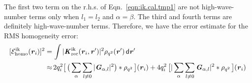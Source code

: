 \documentclass[aps,pre,preprint,unsortedaddress]{revtex4}
\renewcommand{\v}[1]{\textbf{\textit{#1}}}
\renewcommand{\d}[1]{\textsf{#1}}
\begin{document}
The first two term on the r.h.s. of Eqn.~\eqref{eqn:ik.cal.tmp1}
are not high-wave-number terms only when $l_1 = l_2$ and $\alpha=\beta$.
The third and fourth terms are definitely high-wave-number terms.
Therefore, we have the error estimate
for the RMS homogeneity error:
\begin{align}\nonumber
  [\mathcal E^{\textrm{ik}}_{\textrm{homo}}(\v r_i)]^2
  = \,&
  \int
  \vert\v K^{\textrm{ik}}_{\textrm{rec}}(\v r_i,\v r')\vert^2
  \rho_{q^2}(\v r')\,\d d\v r' \\
  \approx\,&  
  2q_i^2
  \big[\,
  \big(
  \sum_{\alpha} \sum_{l\neq 0}
  \vert \v G_{\alpha,l}\vert^2
  \big)
  \ast \rho_{q^2}
  \,\big] (\v r_i)
  +
  4q_i^2\,
  \big[
  \vert
  \sum_{\alpha} \sum_{l\neq 0}  
  \v G_{\alpha,l}
  \vert^2
  \ast \rho_{q^2}\,
  \big] (\v r_i) 
\end{align}
\end{document}
